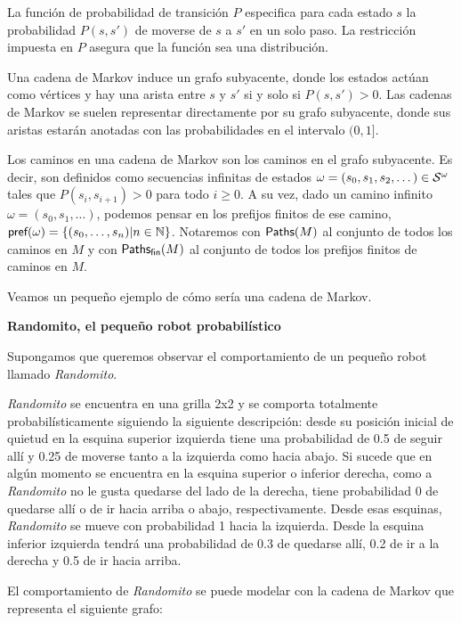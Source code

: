 La función de probabilidad de transición $P$ especifica para cada estado $s$ la
probabilidad $P(s, s')$ de moverse de $s$ a $s'$ en un solo paso. La
restricción impuesta en $P$ asegura que la función sea una distribución.

Una cadena de Markov induce un grafo subyacente, donde los estados actúan como
vértices y hay una arista entre $s$ y $s'$ si y solo si $P(s, s') > 0$. Las
cadenas de Markov se suelen representar directamente por su grafo subyacente,
donde sus aristas estarán anotadas con las probabilidades en el intervalo $(0,
	1]$.

Los caminos en una cadena de Markov son los caminos en el grafo subyacente. Es
decir, son definidos como secuencias infinitas de estados $\omega = (s_0, s_1,
	s_2, \dots) \in \mathcal{S}^\omega$ tales que $P(s_i, s_{i+1}) > 0 $ para todo $i \geq
	0$. A su vez, dado un camino infinito $\omega = (s_0, s_1, \dots)$, podemos
pensar en los prefijos finitos de ese camino, $\textsf{pref}(\omega) = \{(s_0,
	\dots, s_n) | n \in \mathbb{N}\}$. Notaremos con $\textsf{Paths}(M)$ al conjunto de
todos los caminos en $M$ y con $\textsf{Paths}_\textsf{fin}(M)$ al conjunto de todos los prefijos
finitos de caminos en $M$.

Veamos un pequeño ejemplo de cómo sería una cadena de Markov.

\textbf{Randomito, el pequeño robot probabilístico}

Supongamos que queremos observar el comportamiento de un pequeño robot llamado
\textit{Randomito}.

\textit{Randomito} se encuentra en una grilla 2x2 y se comporta totalmente probabilísticamente siguiendo la siguiente descripción: desde su posición inicial de quietud en la esquina superior izquierda tiene una probabilidad de 0.5 de seguir allí y 0.25 de moverse tanto a la izquierda como hacia abajo. Si sucede que en algún momento se encuentra en la esquina superior o inferior derecha, como a \emph{Randomito} no le gusta quedarse del lado de la derecha, tiene probabilidad 0 de quedarse allí o de ir hacia arriba o abajo, respectivamente. Desde esas esquinas, \emph{Randomito} se mueve con probabilidad 1 hacia la izquierda. Desde la esquina inferior izquierda tendrá una probabilidad de 0.3 de quedarse allí, 0.2 de ir a la derecha y 0.5 de ir hacia arriba.

El comportamiento de \emph{Randomito} se puede modelar con la cadena de Markov
que representa el siguiente grafo:

